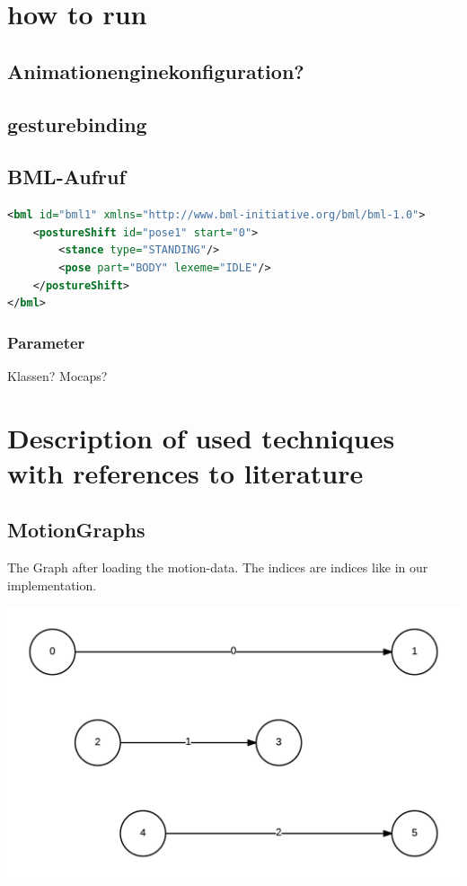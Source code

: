 \documentclass[a4paper,10pt]{scrartcl}
\let\stdsubsection\subsection
\renewcommand\subsection{\nopagebreak\stdsubsection}
\begin{document}
\tableofcontents

\section{how to run}

\subsection{Animationenginekonfiguration?}

\subsection{gesturebinding}

\subsection{BML-Aufruf}

\begin{lstlisting}[language=XML]
<bml id="bml1" xmlns="http://www.bml-initiative.org/bml/bml-1.0">
    <postureShift id="pose1" start="0">
        <stance type="STANDING"/>
        <pose part="BODY" lexeme="IDLE"/>
    </postureShift>
</bml>
 \end{lstlisting}

\subsubsection{Parameter}
Klassen? Mocaps?


\section{Description of used techniques with references to literature}

\subsection{MotionGraphs}

The Graph after loading the motion-data. The indices are indices like in our implementation.

\includegraphics[width=\textwidth/2]{img/1_GraphAtStart.png}
\end{document}
